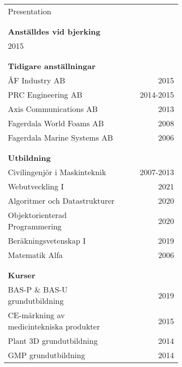 \documentclass[a4paper, 10pt]{article}
\newcommand{\employmentyear}{2015} %
\begin{document}
\begin{minipage}[t]{0.6\textwidth}
    \strut\vspace*{-\baselineskip}\newline
    \begin{tabular*}{1\linewidth}{p{0.7\linewidth} r}
        {\Large Presentation} & \\
        & \\
        & \\
        \textbf{Anställdes vid bjerking} & \\
        \employmentyear & \\
        & \\
        & \\
        \textbf{Tidigare anställningar}& \\
        ÅF Industry AB & 2015 \\
        PRC Engineering AB & 2014-2015 \\
        Axis Communications AB & 2013 \\
        Fagerdala World Foams AB & 2008 \\
        Fagerdala Marine Systems AB & 2006 \\
        & \\
        & \\
        \textbf{Utbildning} & \\
        Civilingenjör i Maskinteknik & 2007-2013 \\
        Webutveckling I & 2021 \\
        Algoritmer och Datastrukturer & 2020 \\
        Objektorienterad Programmering & 2020 \\
        Beräkningsvetenskap I & 2019 \\
        Matematik Alfa & 2006 \\
        & \\
        & \\
        \textbf{Kurser}& \\
        BAS-P \& BAS-U grundutbildning & 2019 \\
        CE-märkning av medicintekniska produkter & 2015 \\
        Plant 3D grundutbildning & 2014 \\
        GMP grundutbildning & 2014 \\
    \end{tabular*}
\end{minipage}
\end{document}
